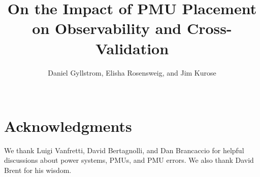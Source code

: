 \documentclass{sig-alternate-eEnergy_v2}
\newcommand{\doctitle}{On the Impact of PMU Placement on Observability and Cross-Validation}
\begin{document}
\title{\doctitle}


\author{
\alignauthor Daniel Gyllstrom, Elisha Rosensweig, and Jim Kurose \\
  \\ 
}

\maketitle









%



%



 






%



\section{Acknowledgments}
We thank Luigi Vanfretti, David Bertagnolli, and  Dan Brancaccio for helpful discussions about power systems, PMUs, and PMU errors.  
We also thank David Brent for his wisdom. 



\end{document}
